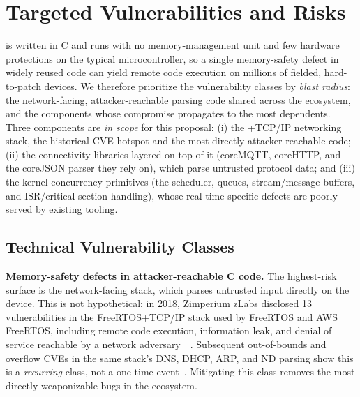 \section{Targeted Vulnerabilities and Risks}
\label{sec:vulns}


\ose{} is written in C and runs with no memory-management unit and few hardware protections on the typical microcontroller, so a single memory-safety defect in widely reused code can yield remote code execution on millions of fielded, hard-to-patch devices.
We therefore prioritize the vulnerability classes by \emph{blast radius}: the network-facing, attacker-reachable parsing code shared across the ecosystem, and the components whose compromise propagates to the most dependents.
Three components are \emph{in scope} for this proposal: (i) the \ose+TCP/IP networking stack, the historical CVE hotspot and the most directly attacker-reachable code; (ii) the connectivity libraries layered on top of it (coreMQTT, coreHTTP, and the coreJSON parser they rely on), which parse untrusted protocol data; and (iii) the kernel concurrency primitives (the scheduler, queues, stream/message buffers, and ISR/critical-section handling), whose real-time-specific defects are poorly served by existing tooling.

\subsection{Technical Vulnerability Classes}

\noindent\textbf{Memory-safety defects in attacker-reachable C code.}
The highest-risk surface is the network-facing stack, which parses untrusted input directly on the device.
This is not hypothetical: in 2018, Zimperium zLabs disclosed 13 vulnerabilities in the FreeRTOS+TCP/IP stack used by FreeRTOS and AWS FreeRTOS, including remote code execution, information leak, and denial of service reachable by a network adversary~\cite{zimperium2018freertos}~.
Subsequent out-of-bounds and overflow CVEs in the same stack's DNS, DHCP, ARP, and ND parsing show this is a \emph{recurring} class, not a one-time event~.
Mitigating this class removes the most directly weaponizable bugs in the ecosystem.

